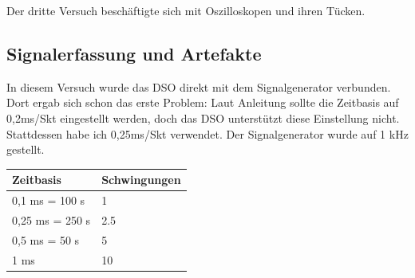 

\setcounter{section}{3}
Der dritte Versuch beschäftigte sich mit Oszilloskopen und ihren Tücken.

\subsection{Signalerfassung und Artefakte}
In diesem Versuch wurde das DSO direkt mit dem Signalgenerator verbunden. Dort ergab sich schon das erste Problem: Laut Anleitung sollte die Zeitbasis auf 0,2ms/Skt eingestellt werden, doch das DSO unterstützt diese Einstellung nicht. Stattdessen habe ich 0,25ms/Skt verwendet.
Der Signalgenerator wurde auf 1 kHz gestellt.\\

\begin{tabular}{|l|l|}
	\hline
	Zeitbasis &  Schwingungen \\
	\hline
	\hline
	0,1 ms = 100 \mu s & 1\\
	\hline
	0,25 ms = 250 \mu s & 2.5\\
	\hline
	0,5 ms = 50 \mu s & 5\\
	\hline
	1 ms & 10 \\
	\hline
\end{tabular}
\vspace{0.5cm}

